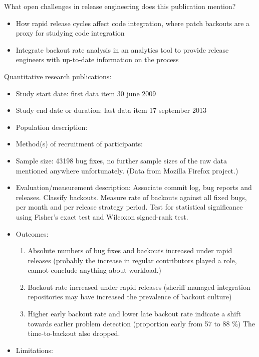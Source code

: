 \documentclass[]{book}
\providecommand{\tightlist}{%
  \setlength{\itemsep}{0pt}\setlength{\parskip}{0pt}}
\begin{document}
What open challenges in release engineering does this publication
mention?

\begin{itemize}
\tightlist
\item
  How rapid release cycles affect code integration, where patch backouts
  are a proxy for studying code integration
\item
  Integrate backout rate analysis in an analytics tool to provide
  release engineers with up-to-date information on the process
\end{itemize}

Quantitative research publications:

\begin{itemize}
\tightlist
\item
  Study start date: first data item 30 june 2009
\item
  Study end date or duration: last data item 17 september 2013
\item
  Population description:
\item
  Method(s) of recruitment of participants:
\item
  Sample size: 43198 bug fixes, no further sample sizes of the raw data
  mentioned anywhere unfortunately. (Data from Mozilla Firefox project.)
\item
  Evaluation/measurement description: Associate commit log, bug reports
  and releases. Classify backouts. Measure rate of backouts against all
  fixed bugs, per month and per release strategy period. Test for
  statistical significance using Fisher's exact test and Wilcoxon
  signed-rank test.
\item
  Outcomes:

  \begin{enumerate}
  \def\labelenumi{\arabic{enumi}.}
  \tightlist
  \item
    Absolute numbers of bug fixes and backouts increased under rapid
    releases (probably the increase in regular contributors played a
    role, cannot conclude anything about workload.)
  \item
    Backout rate increased under rapid releases (sheriff managed
    integration repositories may have increased the prevalence of
    backout culture)
  \item
    Higher early backout rate and lower late backout rate indicate a
    shift towards earlier problem detection (proportion early from 57 to
    88 \%) The time-to-backout also dropped.
  \end{enumerate}
\item
  Limitations:


\end{itemize}
\end{document}
